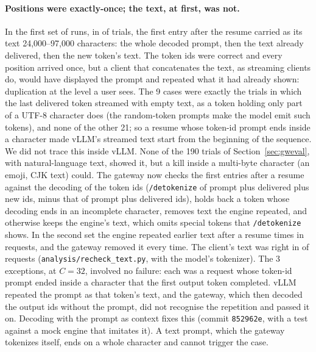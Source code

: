 \documentclass[10pt,twocolumn]{article}
\begin{document}
\paragraph{Positions were exactly-once; the text, at first, was not.} In the
first set of runs, in \PfbEcho{} of \PfbOldTrials{} trials, the first entry
after the resume carried as its text 24{,}000--97{,}000 characters: the whole
decoded prompt, then the text already delivered, then the new token's text.
The token ids were correct and every position arrived once, but a client that
concatenates the text, as streaming clients do, would have displayed the
prompt and repeated what it had already shown: duplication at the level a
user sees. The 9 cases were exactly the trials in which the last delivered
token streamed with empty text, as a token holding only part of a UTF-8
character does (the random-token prompts make the model emit such tokens),
and none of the other 21; so a resume whose token-id prompt ends inside a
character made vLLM's streamed text start from the beginning of the sequence.
We did not trace this inside vLLM. None of the 190 trials of
Section~\ref{sec:gweval}, with natural-language text, showed it, but a kill
inside a multi-byte character (an emoji, CJK text) could. The gateway now
checks the first entries after a resume against the decoding of the token ids
(\texttt{/detokenize} of prompt plus delivered plus new ids, minus that of
prompt plus delivered ids), holds back a token whose decoding ends in an
incomplete character, removes text the engine repeated, and otherwise keeps
the engine's text, which omits special tokens that \texttt{/detokenize}
shows. In the second set the engine repeated earlier text after a resume
\RevRepeatRemoved{} times in \RevRecords{} requests, and the gateway removed it
every time. The client's text was right in \RevTextOk{} of \RevRecords{}
requests (\texttt{analysis/recheck\_text.py}, with the model's tokenizer). The
3 exceptions, at $C{=}32$, involved no failure: each was a request whose
token-id prompt ended inside a character that the first output token
completed. vLLM repeated the prompt as that token's text, and the gateway,
which then decoded the output ids without the prompt, did not recognise the
repetition and passed it on. Decoding with the prompt as context fixes this
(commit \texttt{852962e}, with a test against a mock engine that imitates
it). A text prompt, which the gateway tokenizes itself, ends on a whole
character and cannot trigger the case.
\end{document}
